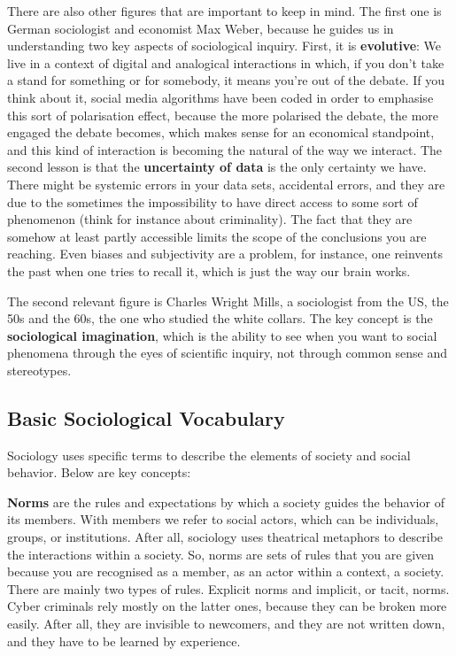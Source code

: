 There are also other figures that are important to keep in mind. The
first one is German sociologist and economist Max Weber, because he
guides us in understanding two key aspects of sociological inquiry.
First, it is \textbf{evolutive}: We live in a context of digital and
analogical interactions in which, if you don't take a stand for
something or for somebody, it means you're out of the debate. If you
think about it, social media algorithms have been coded in order to
emphasise this sort of polarisation effect, because the more polarised
the debate, the more engaged the debate becomes, which makes sense for
an economical standpoint, and this kind of interaction is becoming the
natural of the way we interact. The second lesson is that the
\textbf{uncertainty of data} is the only certainty we have. There
might be systemic errors in your data sets, accidental errors, and
they are due to the sometimes the impossibility to have direct access
to some sort of phenomenon (think for instance about criminality). The
fact that they are somehow at least partly accessible limits the scope
of the conclusions you are reaching. Even biases and subjectivity are
a problem, for instance, one reinvents the past when one tries to 
recall it, which is just the way our brain works.

The second relevant figure is Charles Wright Mills, a sociologist from
the US, the 50s and the 60s, the one who studied the white collars.
The key concept is the \textbf{sociological imagination}, which is the
ability to see when you want to social phenomena through the eyes of
scientific inquiry, not through common sense and stereotypes.



\subsection{Basic Sociological Vocabulary}

Sociology uses specific terms to describe the elements of society and
social behavior. Below are key concepts:

\textbf{Norms} are the rules and expectations by which a society
guides the behavior of its members. With members we refer to social
actors, which can be individuals, groups, or institutions. After all,
sociology uses theatrical metaphors to describe the interactions
within a society. So, norms are sets of rules that you are given
because you are recognised as a member, as an actor within a context,
a society. There are mainly two types of rules. Explicit norms and
implicit, or tacit, norms. Cyber criminals rely mostly on the latter 
ones, because they can be broken more easily. After all, they are
invisible to newcomers, and they are not written down, and they have
to be learned by experience.

